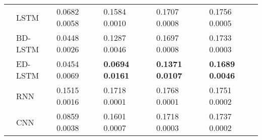 \documentclass[final,5p,times,twocolumn]{elsarticle}
\begin{document}
\begin{table*}[htbp!]
\begin{tabular}{llllll}
&LSTM   & 0.0682    0.0058     	& 0.1584    0.0010       &	 0.1707    0.0008       & 0.1756    0.0005 \\

&BD-LSTM   & 0.0448   0.0026     	&  0.1287   0.0046        &0.1697   0.0008	       &0.1733   0.0003\\

&ED-LSTM   & 0.0454   0.0069     	& \textbf{0.0694   0.0161}        &	\textbf{0.1371   0.0107}        & \textbf{0.1689   0.0046}\\

&RNN  &    0.1515 0.0016    	& 0.1718   0.0001       &	 0.1768   0.0001       &0.1751   0.0002\\

&CNN & 0.0859	 0.0038     	& 	0.1601 	0.0007       &	0.1718 	0.0003       &0.1737 	0.0002\\
\hline

\end{tabular}
\end{table*}
\end{document}
